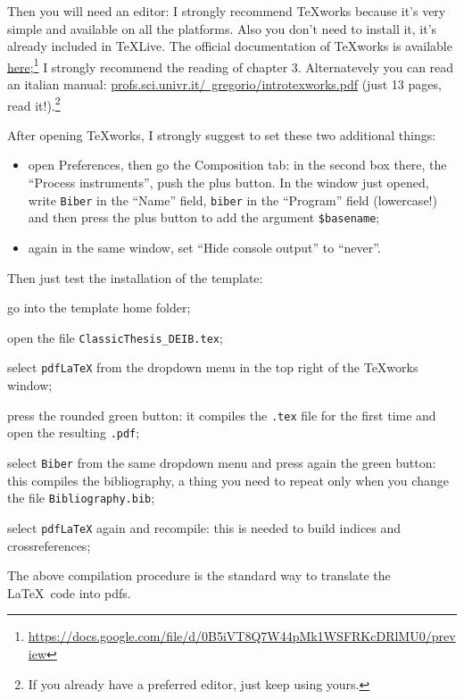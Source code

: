 Then you will need an editor: I strongly recommend TeXworks because it's very simple and available on all the platforms.
Also you don't need to install it, it's already included in TeXLive.
The official documentation of TeXworks is available \href{https://docs.google.com/file/d/0B5iVT8Q7W44pMk1WSFRKcDRlMU0/preview}{here};\footnote{\url{https://docs.google.com/file/d/0B5iVT8Q7W44pMk1WSFRKcDRlMU0/preview}}
I strongly recommend the reading of chapter 3.
Alternatevely you can read an italian manual: \href{http://profs.sci.univr.it/~gregorio/introtexworks.pdf}{profs.sci.univr.it/~gregorio/introtexworks.pdf} (just 13 pages, read it!).\footnote{If you already have a preferred editor, just keep using yours.}

After opening TeXworks, I strongly suggest to set these two additional things:
\begin{itemize}
	\item open Preferences, then go the Composition tab: in the second box there, the \enquote{Process instruments}, push the plus button.
	In the window just opened, write \verb!Biber! in the \enquote{Name} field, \verb!biber! in the \enquote{Program} field (lowercase!) and then press the plus button to add the argument \verb!$basename!;
	\item again in the same window, set \enquote{Hide console output} to \enquote{never}.
\end{itemize}

Then just test the installation of the template:
\begin{aenumerate}
	\item go into the template home folder;
	\item open the file \verb!ClassicThesis_DEIB.tex!;
	\item select \verb!pdfLaTeX! from the dropdown menu in the top right of the TeXworks window;
	\item press the rounded green button: it compiles the \verb!.tex! file for the first time and open the resulting \verb!.pdf!;
	\item select \verb!Biber! from the same dropdown menu and press again the green button: this compiles the bibliography, a thing you need to repeat only when you change the file \verb!Bibliography.bib!;
	\item select \verb!pdfLaTeX! again and recompile: this is needed to build indices and crossreferences;
\end{aenumerate}
The above compilation procedure is the standard way to translate the \LaTeX\ code into pdfs.

